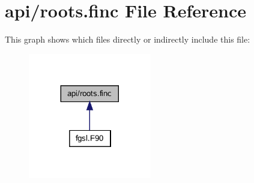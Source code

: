 \hypertarget{roots_8finc}{}\section{api/roots.finc File Reference}
\label{roots_8finc}
This graph shows which files directly or indirectly include this file\+:\nopagebreak
\begin{figure}[H]
\begin{center}
\leavevmode
\includegraphics[width=152pt]{roots_8finc__dep__incl}
\end{center}
\end{figure}
